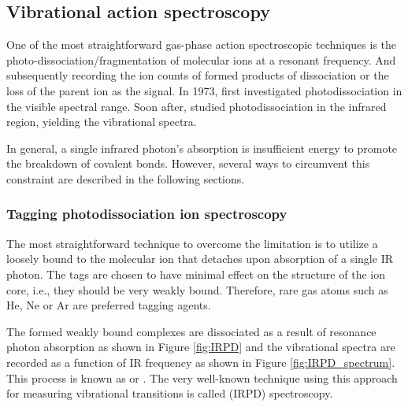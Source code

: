 \subsection{Vibrational action spectroscopy}
\label{subsec:action:methods:vibrational}

One of the most straightforward gas-phase action spectroscopic techniques is the photo-dissociation/fragmentation of molecular ions at a resonant frequency. And subsequently recording the ion counts of formed products of dissociation or the loss of the parent ion as the signal.
In 1973, \citet{dunbar_photodissociation_1973} first investigated photodissociation in the visible spectral range. Soon after, \citet{okumura_vibrational_1985} studied photodissociation in the infrared region, yielding the vibrational spectra.

In general, a single infrared photon's absorption is insufficient energy to promote the breakdown of covalent bonds. However, several ways to circumvent this constraint are described in the following sections.

\subsubsection{Tagging photodissociation ion spectroscopy}
\label{subsec:action:methods:vibrational:IRPD}
The most straightforward technique to overcome the limitation is to utilize a loosely bound  to the molecular ion that detaches upon absorption of a single IR photon. The tags are chosen to have minimal effect on the structure of the ion core, i.e., they should be very weakly bound. Therefore, rare gas atoms such as He, Ne or Ar are preferred tagging agents.

The formed weakly bound complexes are dissociated as a result of resonance photon absorption as shown in Figure \ref{fig:IRPD} and the vibrational spectra are recorded as a function of IR frequency as shown in Figure \ref{fig:IRPD_spectrum}. This process is known as  or . The very well-known technique using this approach for measuring vibrational transitions is called  (IRPD) spectroscopy.

